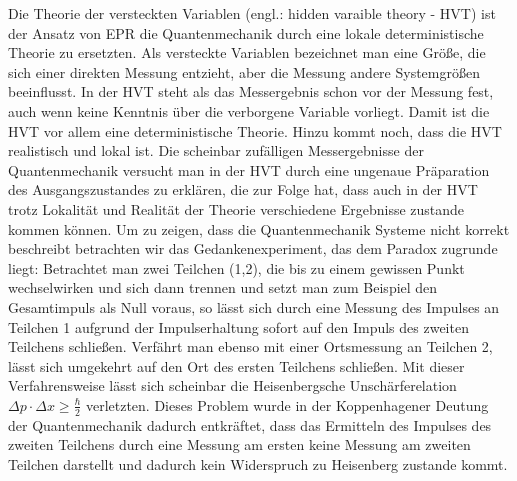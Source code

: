 \documentclass[twoside,colorback,accentcolor=tud4c,11pt]{tudreport}
\begin{document}
Die Theorie der versteckten Variablen (engl.: hidden varaible theory - HVT) ist der Ansatz von EPR die Quantenmechanik durch eine lokale deterministische Theorie zu ersetzten. Als versteckte Variablen bezeichnet man eine Größe, die sich einer direkten Messung entzieht, aber die Messung andere Systemgrößen beeinflusst. In der HVT steht als das Messergebnis schon vor der Messung fest, auch wenn keine Kenntnis über die verborgene Variable vorliegt. Damit ist die HVT vor allem eine deterministische Theorie. Hinzu kommt noch, dass die HVT realistisch und lokal ist. Die scheinbar zufälligen Messergebnisse der Quantenmechanik versucht man in der HVT durch eine ungenaue Präparation des Ausgangszustandes zu erklären, die zur Folge hat, dass auch in der HVT trotz Lokalität und Realität der Theorie verschiedene Ergebnisse zustande kommen können.
Um zu zeigen, dass die Quantenmechanik Systeme nicht korrekt beschreibt betrachten wir das Gedankenexperiment, das dem Paradox zugrunde liegt:
Betrachtet man zwei Teilchen (1,2), die bis zu einem gewissen Punkt wechselwirken und sich dann trennen und setzt man zum Beispiel den Gesamtimpuls als Null voraus, so lässt sich durch eine Messung des Impulses an Teilchen 1 aufgrund der Impulserhaltung sofort auf den Impuls des zweiten Teilchens schließen. Verfährt man ebenso mit einer Ortsmessung an Teilchen 2, lässt sich umgekehrt auf den Ort des ersten Teilchens schließen. Mit dieser Verfahrensweise lässt sich scheinbar die Heisenbergsche Unschärferelation $\Delta p\cdot\Delta x\geq\frac{\hbar}{2}$ verletzten. Dieses Problem wurde in der Koppenhagener Deutung der Quantenmechanik dadurch entkräftet, dass das Ermitteln des Impulses des zweiten Teilchens durch eine Messung am ersten keine Messung am zweiten Teilchen darstellt und dadurch kein Widerspruch zu Heisenberg zustande kommt.
\end{document}
